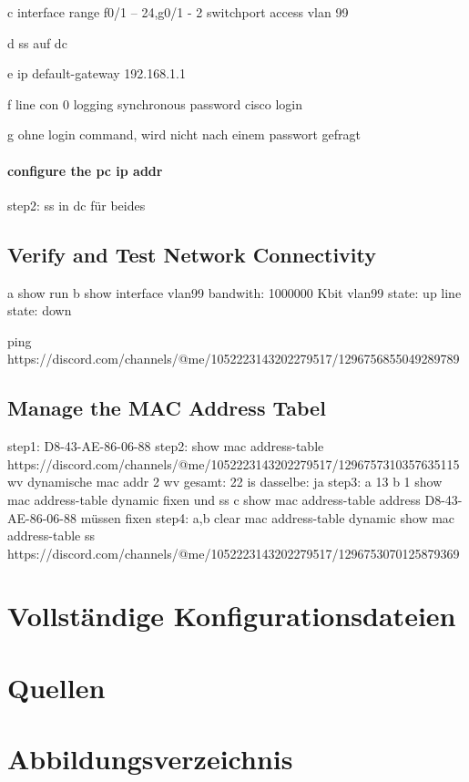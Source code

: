 \documentclass[a4paper]{article}
\begin{document}
c
interface range f0/1 – 24,g0/1 - 2
switchport access vlan 99

d
ss auf dc

e
ip default-gateway 192.168.1.1

f
line con 0 
logging synchronous
password cisco
login

g
ohne login command, wird nicht nach einem passwort gefragt


\paragraph {configure the pc ip addr}
step2:
ss in dc für beides
\subsection{Verify and Test Network Connectivity}
a
show run
b
show interface vlan99
bandwith: 1000000 Kbit
vlan99 state: up
line state: down

ping
https://discord.com/channels/@me/1052223143202279517/1296756855049289789


\subsection{Manage the MAC Address Tabel}

step1: 
D8-43-AE-86-06-88
step2:
show mac address-table
https://discord.com/channels/@me/1052223143202279517/1296757310357635115
wv dynamische mac addr
2
wv gesamt:
22
is dasselbe:
ja
step3:
a
13
b
1
show mac address-table dynamic
fixen und ss
c
show mac address-table address D8-43-AE-86-06-88
müssen fixen
step4:
a,b
clear mac address-table dynamic
show mac address-table
ss
https://discord.com/channels/@me/1052223143202279517/1296753070125879369
\newpage

\section{Vollständige Konfigurationsdateien}

\newpage

\section{Quellen}

\newpage
\section{Abbildungsverzeichnis}

\listoffigures
\end{document}
